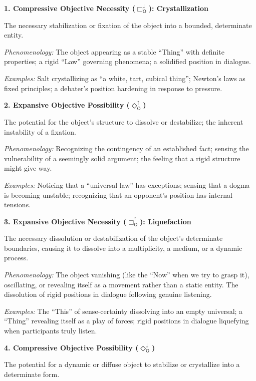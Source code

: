 \documentclass[12pt]{book}
\newcommand{\OBoxUp}{\Box_{\mathsf{O}}^{\uparrow}}
\newcommand{\OBoxDown}{\Box_{\mathsf{O}}^{\downarrow}}
\newcommand{\ODiaUp}{\Diamond_{\mathsf{O}}^{\uparrow}}
\newcommand{\ODiaDown}{\Diamond_{\mathsf{O}}^{\downarrow}}
\begin{document}
\bigskip

\noindent\textbf{1. Compressive Objective Necessity ($\OBoxDown$): Crystallization}

The necessary stabilization or fixation of the object into a bounded, determinate entity.

\textit{Phenomenology:} The object appearing as a stable ``Thing'' with definite properties; a rigid ``Law'' governing phenomena; a solidified position in dialogue.

\textit{Examples:} Salt crystallizing as ``a white, tart, cubical thing''; Newton's laws as fixed principles; a debater's position hardening in response to pressure.

\bigskip

\noindent\textbf{2. Expansive Objective Possibility ($\ODiaUp$)}

The potential for the object's structure to dissolve or destabilize; the inherent instability of a fixation.

\textit{Phenomenology:} Recognizing the contingency of an established fact; sensing the vulnerability of a seemingly solid argument; the feeling that a rigid structure might give way.

\textit{Examples:} Noticing that a ``universal law'' has exceptions; sensing that a dogma is becoming unstable; recognizing that an opponent's position has internal tensions.

\bigskip

\noindent\textbf{3. Expansive Objective Necessity ($\OBoxUp$): Liquefaction}

The necessary dissolution or destabilization of the object's determinate boundaries, causing it to dissolve into a multiplicity, a medium, or a dynamic process.

\textit{Phenomenology:} The object vanishing (like the ``Now'' when we try to grasp it), oscillating, or revealing itself as a movement rather than a static entity. The dissolution of rigid positions in dialogue following genuine listening.

\textit{Examples:} The ``This'' of sense-certainty dissolving into an empty universal; a ``Thing'' revealing itself as a play of forces; rigid positions in dialogue liquefying when participants truly listen.

\bigskip

\noindent\textbf{4. Compressive Objective Possibility ($\ODiaDown$)}

The potential for a dynamic or diffuse object to stabilize or crystallize into a determinate form.
\end{document}
